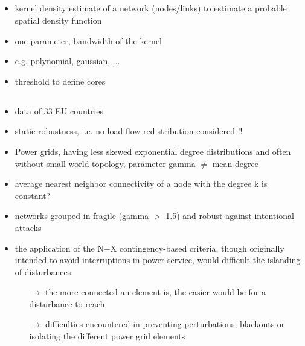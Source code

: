 \documentclass[paper=a4, fontsize=12pt]{article}
\begin{document}
\subsection*{\citeauthor{Liu2010} \cite{Liu2010}}

\begin{itemize}
\item kernel density estimate of a network (nodes/links) to estimate a probable spatial density function
\item one parameter, bandwidth of the kernel
\item e.g. polynomial, gaussian, ...
\item threshold to define cores
\end{itemize}

\subsection*{\citeauthor{Rosas-Casals2007} \cite{Rosas-Casals2007}}

\begin{itemize}
\item data of 33 EU countries 
\item static robustness, i.e. no load flow redistribution considered !!

\item Power grids, having less skewed exponential degree distributions and often without small-world topology, parameter gamma $\neq$ mean degree 
\item average nearest neighbor connectivity of a node with the degree k is constant? 

\item networks grouped in fragile (gamma $>$ 1.5) and robust against intentional attacks
\item the application of the N−X contingency-based criteria, though originally intended to avoid interruptions in power service, would difficult the islanding of disturbances 
\begin{itemize}
\item[$\rightarrow$ ] the more connected an element is, the easier would be for a disturbance to reach
\item[$\rightarrow$ ] difficulties encountered in preventing perturbations, blackouts or isolating the different power grid elements
\end{itemize}
	
\end{itemize}

\subsection*{ \citeauthor{Rosas-Casals2009} \cite{Rosas-Casals2009} }
\end{document}

